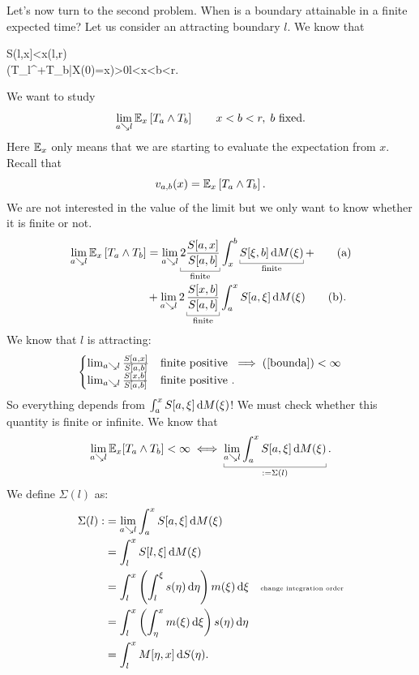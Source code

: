 \documentclass[12pt]{report}
\begin{document}
Let's now turn to the second problem. When is a boundary attainable in a finite expected time? Let us consider an attracting boundary $l$. We know that
\begin{larray}
	\to S(l,x]<\infty\qquad\every x\in(l,r)\\
	\to\pr(T_{l^{+}}\leq T_{b}|X(0)=x)>0\qquad\every l<x<b<r.
\end{larray}
We want to study
\begin{equation*}
	\lim_{a\searrow l}\mathbb{E}_{x}\left[T_{a}\wedge T_{b}\right]\qquad x<b<r,\;b\text{ fixed}.
\end{equation*}
Here $\mathbb{E}_{x}$ only means that we are starting to evaluate the expectation from $x$.
Recall that 
\begin{equation*}
	v_{a,b}(x)=\mathbb{E}_{x}\left[T_{a}\wedge T_{b}\right].
\end{equation*}
We are not interested in the value of the limit but we only want to know whether it is finite or not.
\begin{align}
	\lim_{a\searrow l}\evs_{x}\left[T_{a}\wedge T_{b}\right]&=\lim_{a\searrow l}\ubracketthin{2\frac{S[a,x]}{S[a,b]}}_{\claptext{finite}}\int_{x}^{b}\ubracketthin{S[\xi,b]\dif M(\xi)}_{\claptext{finite}}+\tag{a}\label{bounda}\\
	&+\lim_{a\searrow l}2\ubracketthin{\frac{S[x,b]}{S[a,b]}}_{\claptext{finite}}\int_{a}^{x}S[a,\xi]\dif M(\xi)\tag{b}\label{boundb}.
\end{align} We know that $l$ is attracting:
\begin{equation*}
	\begin{cases}
		\lim_{a\searrow l}\frac{S[a,x]}{S[a,b]}&\text{finite positive }\implies \text{(\ref{bounda})}<\infty\\
		\lim_{a\searrow l}\frac{S[x,b]}{S[a,b]}&\text{finite positive }.
	\end{cases}
\end{equation*}
So everything depends from $\int_{a}^{x}S[a,\xi]\mathop{}\!\mathrm{d} M(\xi)$! We must check whether this quantity is finite or infinite.
We know that
\begin{equation*}
	\lim_{a\searrow l}\evs_{x}[T_{a}\wedge T_{b}]<\infty\iff\ubracketthin{\lim_{a\searrow l}\int_{a}^{x}S[a,\xi]\dif M(\xi)}_{:=\Sigma(l)}.
\end{equation*}
We define $\Sigma(l)$ as:
\begin{align*}
	\Sigma(l):&=\lim_{a\searrow l}\int_{a}^{x}S[a,\xi]\mathop{}\!\mathrm{d} M(\xi)\\
	&=\int_{l}^{x}S[l,\xi]\mathop{}\!\mathrm{d} M(\xi)\\
	&=\int_{l}^{x}\left(\int_{l}^{\xi}s(\eta)\mathop{}\!\mathrm{d}\eta\right)m(\xi)\mathop{}\!\mathrm{d}\xi\quad\scriptscriptstyle\text{change integration order}\\
	&=\int_{l}^{x}\left(\int_{\eta}^{x}m(\xi)\mathop{}\!\mathrm{d}\xi\right)s(\eta)\mathop{}\!\mathrm{d}\eta\\
	&=\int_{l}^{x}M[\eta,x]\mathop{}\!\mathrm{d} S(\eta).
\end{align*}
\end{document}
